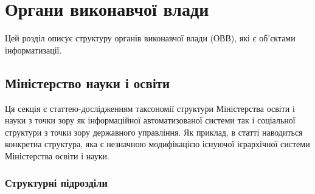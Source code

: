 \chapter{Органи виконавчої влади}

Цей розділ описує структуру органів виконавчої влади (ОВВ), які
є об'єктами інформатизації.

\section{Міністерство науки і освіти}

Ця секція є статтею-дослідженням таксономії структури Міністерства освіти і науки з точки зору як інформаційної автоматизованої системи так і соціальної структури з точки зору державного управління. Як приклад, в статті наводиться конкретна структура, яка є незначною модифікацією існуючої ієрархічної системи Міністерства освіти і науки.

\subsection{Структурні підрозділи}

